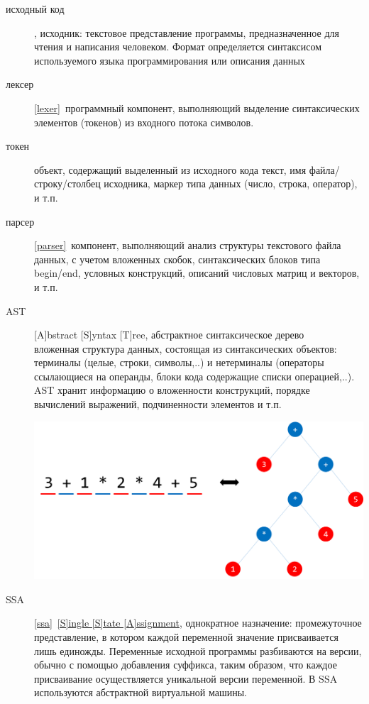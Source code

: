 \label{compiler}\secdown


\begin{description}
\item[исходный код], исходник: текстовое представление программы,
предназначенное для чтения и написания человеком. Формат определяется
синтаксисом используемого языка программирования или описания данных 
\item[лексер] \ref{lexer}\ программный компонент, выполняющий выделение 
синтаксических элементов (токенов) из входного потока символов.
\item[токен] объект, содержащий выделенный из исходного кода текст,
имя файла/строку/столбец исходника, маркер типа данных (число, строка, оператор),
и т.п.
\item[парсер] \ref{parser}\ компонент, выполняющий анализ структуры текстового файла данных,
с учетом вложенных скобок, синтаксических блоков типа begin/end, условных конструкций,
описаний числовых матриц и векторов, и т.п.
\item[AST] [A]bstract [S]yntax [T]ree, абстрактное синтаксическое дерево\\
вложенная структура данных, состоящая из синтаксических объектов: 
терминалы (целые, строки, символы,..) и нетерминалы (операторы ссылающиеся на операнды,
блоки кода содержащие списки операцией,..). AST хранит информацию о вложенности конструкций,
порядке вычислений выражений, подчиненности элементов и т.п.

\noindent\includegraphics[height=0.5\textheight]{fig/ast.png}

\item[SSA] \ref{ssa}\ \href{https://ru.wikipedia.org/wiki/SSA}{[S]ingle [S]tate
[A]ssignment}, 
однократное назначение: промежуточное представление, в котором каждой переменной 
значение присваивается лишь единожды. Переменные исходной программы разбиваются 
на версии, обычно с помощью добавления суффикса, таким образом, что каждое 
присваивание осуществляется уникальной версии переменной.
В SSA используются  
абстрактной виртуальной машины. 

  
\end{description}

